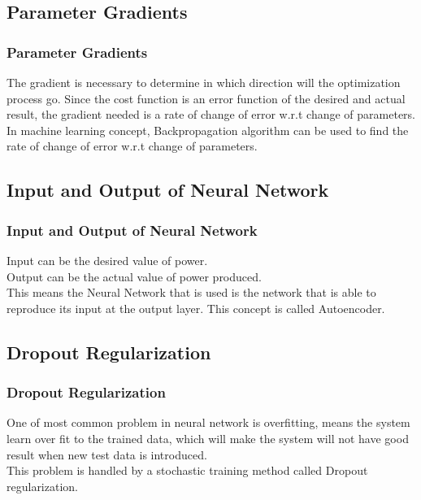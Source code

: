 \documentclass{beamer}
\begin{document}
\subsection{Parameter Gradients}
	\begin{frame}\frametitle{Parameter Gradients}
	\begin{definition}
	The gradient is necessary to determine in which direction will the optimization process go. Since the cost function is an error function of the desired and actual result, the gradient needed is a rate of change of error w.r.t change of parameters.\\
	In machine learning concept, Backpropagation algorithm can be used to find the rate of change of error w.r.t change of parameters.
	\end{definition}
\end{frame}

\subsection{Input and Output of Neural Network}
	\begin{frame}\frametitle{Input and Output of Neural Network}
	\begin{definition}
	Input can be the desired value of power.\\
	Output can be the actual value of power produced.\\
	This means the Neural Network that is used is the network that is able to reproduce its input at the output layer.
	This concept is called Autoencoder.
	\end{definition}
\end{frame}

\subsection{Dropout Regularization}
	\begin{frame}\frametitle{Dropout Regularization}
	\begin{definition}
	One of most common problem in neural network is overfitting, means the system learn over fit to the trained data, which will make the system will not have good result when new test data is introduced.\\
	This problem is handled by a stochastic training method called Dropout regularization.
	\end{definition}
\end{frame}
\end{document}
